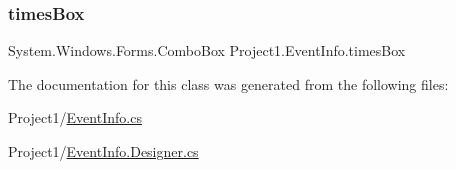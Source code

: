 \subsubsection{\texorpdfstring{times\+Box}{timesBox}}
{\footnotesize\ttfamily System.\+Windows.\+Forms.\+Combo\+Box Project1.\+Event\+Info.\+times\+Box\hspace{0.3cm}{\ttfamily [private]}}



The documentation for this class was generated from the following files\+:\begin{DoxyCompactItemize}
\item 
Project1/\hyperlink{EventInfo_8cs}{Event\+Info.\+cs}\item 
Project1/\hyperlink{EventInfo_8Designer_8cs}{Event\+Info.\+Designer.\+cs}\end{DoxyCompactItemize}
